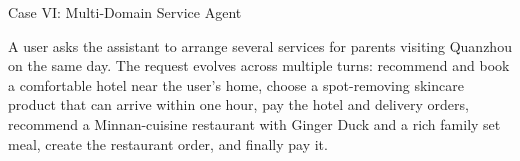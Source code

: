 \documentclass{llmxive}
\providecommand{\subsubsubsection}{\vskip
5pt{\noindent\normalsize\rm\raggedright}}
\begin{document}
\label{fig:ks_daily_vlog_case}



\subsubsubsection{Case VI: Multi-Domain Service Agent}
\label{agentic_cases}

\begin{caseprompt}
A user asks the assistant to arrange several services for parents visiting Quanzhou on the same day. The request evolves across multiple turns: recommend and book a comfortable hotel near the user's home, choose a spot-removing skincare product that can arrive within one hour, pay the hotel and delivery orders, recommend a Minnan-cuisine restaurant with Ginger Duck and a rich family set meal, create the restaurant order, and finally pay it.
\end{caseprompt}
\end{document}

